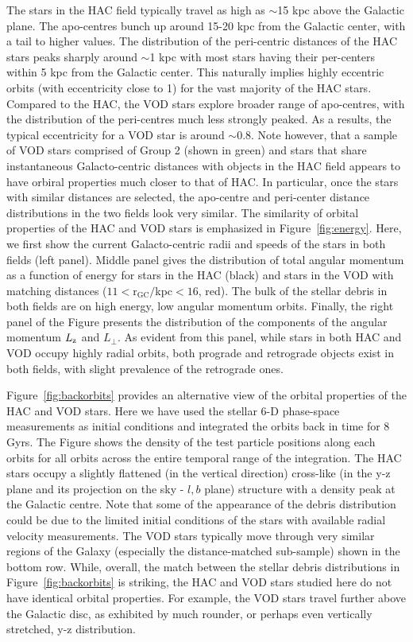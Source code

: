 \documentclass[fleqn,usenatbib]{mnras}
\begin{document}
The stars in the HAC field typically travel as high as $\sim$15 kpc
above the Galactic plane. The apo-centres bunch up around 15-20 kpc
from the Galactic center, with a tail to higher values. The
distribution of the peri-centric distances of the HAC stars peaks
sharply around $\sim$1 kpc with most stars having their per-centers
within 5 kpc from the Galactic center. This naturally implies highly
eccentric orbits (with eccentricity close to 1) for the vast majority
of the HAC stars. Compared to the HAC, the VOD stars explore broader
range of apo-centres, with the distribution of the peri-centres much
less strongly peaked. As a results, the typical eccentricity for a VOD
star is around $\sim$0.8. Note however, that a sample of VOD stars
comprised of Group 2 (shown in green) and stars that share
instantaneous Galacto-centric distances with objects in the HAC field
appears to have orbiral properties much closer to that of HAC. In
particular, once the stars with similar distances are selected, the
apo-centre and peri-center distance distributions in the two fields
look very similar. The similarity of orbital properties of the HAC and
VOD stars is emphasized in Figure~\ref{fig:energy}. Here, we first
show the current Galacto-centric radii and speeds of the stars in both
fields (left panel). Middle panel gives the distribution of total
angular momentum as a function of energy for stars in the HAC (black)
and stars in the VOD with matching distances
($11\mathrm{<r_{GC}}/$kpc$<16$, red). The bulk of the stellar debris
in both fields are on high energy, low angular momentum
orbits. Finally, the right panel of the Figure presents the
distribution of the components of the angular momentum $L_{\rm z}$ and
$L_{\perp}$. As evident from this panel, while stars in both HAC and
VOD occupy highly radial orbits, both prograde and retrograde objects
exist in both fields, with slight prevalence of the retrograde ones.

Figure~\ref{fig:backorbits} provides an alternative view of the
orbital properties of the HAC and VOD stars. Here we have used the
stellar 6-D phase-space measurements as initial conditions and
integrated the orbits back in time for 8 Gyrs. The Figure shows the
density of the test particle positions along each orbits for all
orbits across the entire temporal range of the integration. The HAC
stars occupy a slightly flattened (in the vertical direction)
cross-like (in the y-z plane and its projection on the sky - $l,b$
plane) structure with a density peak at the Galactic centre. Note that
some of the appearance of the debris distribution could be due to the
limited initial conditions of the stars with available radial velocity
measurements. The VOD stars typically move through very similar
regions of the Galaxy (especially the distance-matched sub-sample)
shown in the bottom row. While, overall, the match between the stellar
debris distributions in Figure~\ref{fig:backorbits} is striking, the
HAC and VOD stars studied here do not have identical orbital
properties. For example, the VOD stars travel further above the
Galactic disc, as exhibited by much rounder, or perhaps even
vertically stretched, y-z distribution.
\end{document}
